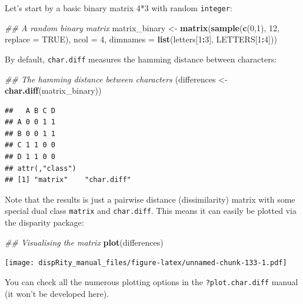 \documentclass[]{book}
\newenvironment{Shaded}{\begin{snugshade}}{\end{snugshade}}
\newcommand{\CommentTok}[1]{\textcolor[rgb]{0.56,0.35,0.01}{\textit{#1}}}
\newcommand{\DataTypeTok}[1]{\textcolor[rgb]{0.13,0.29,0.53}{#1}}
\newcommand{\DecValTok}[1]{\textcolor[rgb]{0.00,0.00,0.81}{#1}}
\newcommand{\KeywordTok}[1]{\textcolor[rgb]{0.13,0.29,0.53}{\textbf{#1}}}
\newcommand{\NormalTok}[1]{#1}
\newcommand{\OperatorTok}[1]{\textcolor[rgb]{0.81,0.36,0.00}{\textbf{#1}}}
\newcommand{\OtherTok}[1]{\textcolor[rgb]{0.56,0.35,0.01}{#1}}
\newcommand{\StringTok}[1]{\textcolor[rgb]{0.31,0.60,0.02}{#1}}
\begin{document}
Let's start by a basic binary matrix 4*3 with random \texttt{integer}:

\begin{Shaded}
\begin{Highlighting}[]
\CommentTok{## A random binary matrix}
\NormalTok{matrix_binary <-}\StringTok{ }\KeywordTok{matrix}\NormalTok{(}\KeywordTok{sample}\NormalTok{(}\KeywordTok{c}\NormalTok{(}\DecValTok{0}\NormalTok{,}\DecValTok{1}\NormalTok{), }\DecValTok{12}\NormalTok{, }\DataTypeTok{replace =} \OtherTok{TRUE}\NormalTok{), }\DataTypeTok{ncol =} \DecValTok{4}\NormalTok{,}
                        \DataTypeTok{dimnames =} \KeywordTok{list}\NormalTok{(letters[}\DecValTok{1}\OperatorTok{:}\DecValTok{3}\NormalTok{], LETTERS[}\DecValTok{1}\OperatorTok{:}\DecValTok{4}\NormalTok{]))}
\end{Highlighting}
\end{Shaded}

By default, \texttt{char.diff} measures the hamming distance between characters:

\begin{Shaded}
\begin{Highlighting}[]
\CommentTok{## The hamming distance between characters}
\NormalTok{(differences <-}\StringTok{ }\KeywordTok{char.diff}\NormalTok{(matrix_binary))}
\end{Highlighting}
\end{Shaded}

\begin{verbatim}
##   A B C D
## A 0 0 1 1
## B 0 0 1 1
## C 1 1 0 0
## D 1 1 0 0
## attr(,"class")
## [1] "matrix"    "char.diff"
\end{verbatim}

Note that the results is just a pairwise distance (dissimilarity) matrix with some special dual class \texttt{matrix} and \texttt{char.diff}.
This means it can easily be plotted via the disparity package:

\begin{Shaded}
\begin{Highlighting}[]
\CommentTok{## Visualising the matrix}
\KeywordTok{plot}\NormalTok{(differences)}
\end{Highlighting}
\end{Shaded}

\texttt{[image: dispRity\_manual\_files/figure-latex/unnamed-chunk-133-1.pdf]}

You can check all the numerous plotting options in the \texttt{?plot.char.diff} manual (it won't be developed here).
\end{document}
